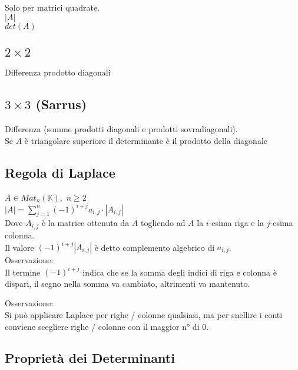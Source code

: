 \documentclass[a4paper, twoside, italian, 11pt]{book}
\newcommand{\K}{\mathbb{K}}
\begin{document}
Solo per matrici quadrate. \\

\noindent
$\left | A \right |$ \\

\noindent
$det(A)$



\subsection{$2 \times 2$}

Differenza prodotto diagonali


\subsection{$3 \times 3$ (Sarrus)}

Differenza (somme prodotti diagonali e prodotti sovradiagonali). \\

\noindent
Se $A$ è triangolare superiore il determinante è il prodotto della diagonale


\subsection{Regola di Laplace}

$A \in Mat_n(\K),$ $n \geq 2$ \\

\noindent
$\left | A \right | = \sum\limits_{j=1}^{n} (-1)^{i+j} a_{i,j} \cdot \left | A_{i,j} \right |$ \\

\noindent
Dove $A_{i,j}$ è la matrice ottenuta da $A$ togliendo ad $A$ la $i$-esima riga e la $j$-esima colonna. \\

\noindent
Il valore $(-1)^{i+j} \left | A_{i,j} \right |$ è detto complemento algebrico di $a_{i,j}$. \\

\noindent
Osservazione: \\
Il termine $(-1)^{i+j}$ indica che se la somma degli indici di riga e colonna è dispari, il segno nella somma va cambiato, altrimenti va mantenuto.

\noindent
Osservazione: \\
Si può applicare Laplace per righe / colonne qualsiasi, ma per snellire i conti conviene scegliere righe / colonne con il maggior n° di $0$.


\subsection{Proprietà dei Determinanti}
\end{document}

